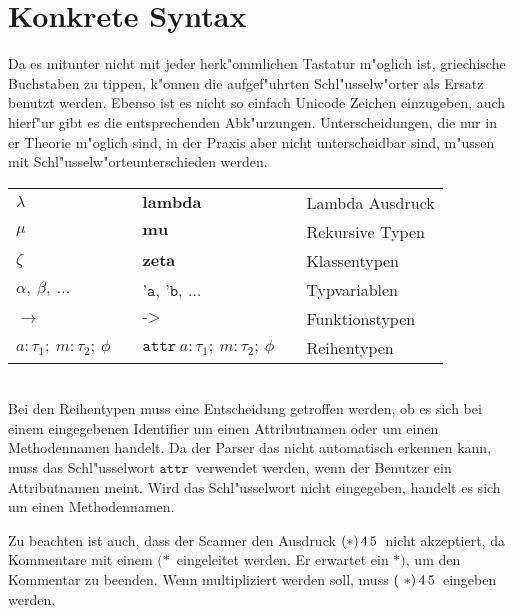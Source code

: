 \section{Konkrete Syntax}
Da es mitunter nicht mit jeder herk"ommlichen Tastatur m"oglich ist, griechische Buchstaben zu tippen,
k"onnen die aufgef"uhrten Schl"usselw"orter als Ersatz benutzt werden. Ebenso ist es nicht so einfach
Unicode Zeichen einzugeben, auch hierf"ur gibt es die entsprechenden Abk"urzungen. Unterscheidungen,
die nur in er Theorie m"oglich sind, in der Praxis aber nicht unterscheidbar sind, m"ussen mit
Schl"usselw"orte\mbox unterschieden werden.\\[5mm]
\begin{tabular}{lll}
  \mbox{$\lambda$}                            & $\textbf{lambda}$                        & Lambda Ausdruck\\
  \mbox{$\mu$}                                & $\textbf{mu}$                            & Rekursive Typen\\
  \mbox{$\zeta$}                              & $\textbf{zeta}$                          & Klassentypen\\
  \mbox{$\alpha,\ \beta,\ \ldots$}            & $\texttt{'a}$, $\texttt{'b}$, $\ldots$   & Typvariablen\\
  \mbox{$\to$}                                & $\texttt{->}$                            & Funktionstypen\\
  \mbox{$a: \tau_1;\ m: \tau_2;\ \phi \quad$} & $\texttt{attr}\ a: \tau_1;\ m: \tau_2;\ \phi \quad$
                                                                                         & Reihentypen\\
\end{tabular}\\[5mm]
Bei den Reihentypen muss eine Entscheidung getroffen werden, ob es sich bei einem eingegebenen Identifier
um einen Attributnamen oder um einen Methodennamen handelt. Da der Parser das nicht automatisch erkennen
kann, muss das Schl"usselwort \glqq$\texttt{attr}$\grqq\ verwendet werden, wenn der Benutzer ein 
Attributnamen meint. Wird das Schl"usselwort nicht eingegeben, handelt es sich um einen Methodennamen.

Zu beachten ist auch, dass der Scanner den Ausdruck \glqq$(*)\,4\,5$\grqq\ nicht akzeptiert,
da Kommentare mit einem \glqq$(*$\grqq\ eingeleitet werden. Er erwartet ein \glqq$*)$\grqq,
um den Kommentar zu beenden. Wenn multipliziert werden soll, muss \glqq$(\ *)\,4\,5$\grqq\ 
eingeben werden.



